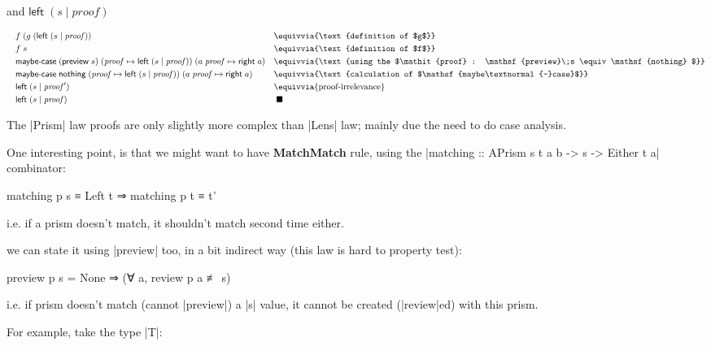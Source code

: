 \documentclass{article}
\begin{document}
and $\mathsf{left}\;(s \mid \mathit{proof})$

\begin{equation}
\begin{aligned}
  \quad & f\; (g\; (\mathsf{left}\;(s \mid \mathit{proof}))       &&\equivvia{\text{definition of $g$}} \\
      & f\; s                                          &&\equivvia{\text{definition of $f$}}  \\
      & \mathsf{maybe\textnormal{-}case}\;(\mathsf{preview}\;s)\; (\mathit{proof} \mapsto \mathsf{left}\;(s \mid \mathit{proof}))\; (a\; \mathit{proof} \mapsto \mathsf{right}\; a)
                                                       &&\equivvia{\text{using the $\mathit{proof} : \mathsf{preview}\;s \equiv \mathsf{nothing} $}} \\
      & \mathsf{maybe\textnormal{-}case}\;\mathsf{nothing}\; (\mathit{proof} \mapsto \mathsf{left}\;(s \mid \mathit{proof}))\; (a\; \mathit{proof} \mapsto \mathsf{right}\; a)
                                               &&\equivvia{\text{calculation of $\mathsf{maybe\textnormal{-}case}$}} \\
      & \mathsf{left}\;(s \mid \mathit{proof}') && \equivvia{\text{proof-irrelevance}} \\
      & \mathsf{left}\;(s \mid \mathit{proof}) &&\;\blacksquare
\end{aligned}
\end{equation}

The |Prism| law proofs are only slightly more complex than |Lens| law;
mainly due the need to do case analysis.

One interesting point, is that we might want to have \textbf{MatchMatch} rule,
using the |matching :: APrism s t a b -> s -> Either t a| combinator:
\begin{code}
matching p s ≡ Left t ⇒ matching p t ≡ t'
\end{code}
i.e. if a prism doesn't match, it shouldn't match second time either.

we can state it using |preview| too, in a bit indirect way
(this law is hard to property test):

\begin{code}
preview p s = None ⇒ (∀ a, review p a ≢ s)
\end{code}
i.e. if prism doesn't match (cannot |preview|) a |s| value,
it cannot be created (|review|ed) with this prism.

For example, take the type |T|:
\end{document}
